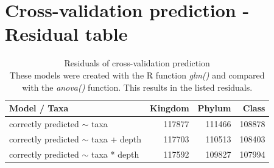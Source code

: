   \section{Cross-validation prediction - Residual table}
    \begin{table}[h]
      \begin{center}
        \begin{tabular}{ |l|r|r|r| }
          \hline
          \bfseries Model / Taxa &\bfseries  Kingdom & \bfseries Phylum & \bfseries Class \\%
          \hline \hline
          correctly predicted $\sim$ taxa & 117877 & \cellcolor{green!30}111466 & \cellcolor{green!45}108878 \\%
          \hline
          correctly predicted $\sim$ taxa + depth & 117703 & \cellcolor{green!35}110513 & \cellcolor{green!45}108403 \\%
          \hline
          correctly predicted $\sim$ taxa * depth & 117592 & \cellcolor{green!40}109827 & \cellcolor{green!50}107994 \\%
          \hline
        \end{tabular} 
      \end{center}
      \caption{Residuals of cross-validation prediction \\
        These models were created with the R function \textit{glm()} and compared with the 
          \textit{anova()} function. This results in the listed residuals.}
      \label{table:Residuals cross-validation} 
    \end{table}


